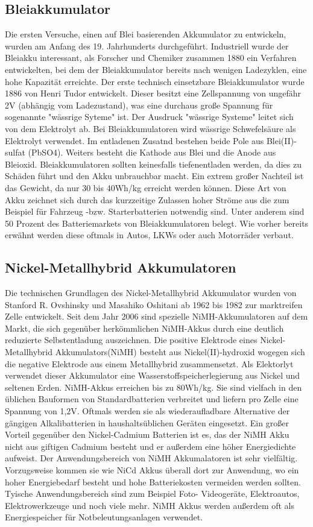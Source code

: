 \subsection{Bleiakkumulator}
Die ersten Versuche, einen auf Blei basierenden Akkumulator zu entwickeln, wurden am Anfang des 19. Jahrhunderts durchgeführt. Industriell wurde der Bleiakku interessant, als Forscher und Chemiker zusammen 1880 ein Verfahren entwickelten, bei dem der Bleiakkumulator bereits nach wenigen Ladezyklen, eine hohe Kapazität erreichte. Der erste technisch einsetzbare Bleiakkumulator wurde 1886 von Henri Tudor entwickelt. Dieser besitzt eine Zellspannung von ungefähr 2V (abhängig vom Ladezustand), was eine durchaus große Spannung für sogenannte "wässrige Syteme"  ist. Der Ausdruck "wässrige Systeme"  leitet sich von dem Elektrolyt ab. Bei Bleiakkumulatoren wird wässrige Schwefelsäure als Elektrolyt verwendet. Im entladenen Zusatnd bestehen beide Pole aus Blei(II)-sulfat (PbSO4). Weiters besteht die Kathode aus Blei und die Anode aus Bleioxid. Bleiakkumulatoren sollten keinesfalls tiefenentladen werden, da dies zu Schäden führt und den Akku unbrauchbar macht. Ein extrem großer Nachteil ist das Gewicht, da nur 30 bis 40Wh/kg erreicht werden können.
Diese Art von Akku zeichnet sich durch das kurzzeitige Zulassen hoher Ströme aus die zum Beispiel für Fahrzeug -bzw. Starterbatterien notwendig sind. Unter anderem sind 50 Prozent des Batteriemarkets von Bleiakkumulatoren belegt. Wie vorher bereits erwähnt werden diese oftmals in Autos, LKWs oder auch Motorräder verbaut.

\subsection{Nickel-Metallhybrid Akkumulatoren}
Die technischen Grundlagen des Nickel-Metallhybrid Akkumulator wurden von Stanford R. Ovshinsky und Masahiko Oshitani ab 1962 bis 1982 zur marktreifen Zelle entwickelt. Seit dem Jahr 2006 sind spezielle NiMH-Akkumulatoren auf dem Markt, die sich gegenüber herkömmlichen NiMH-Akkus durch eine deutlich reduzierte Selbstentladung auszeichnen. Die positive Elektrode eines Nickel-Metallhybrid Akkumulators(NiMH) besteht aus Nickel(II)-hydroxid wogegen sich die negative Elektrode aus einem Metallhybrid zusammensetzt. Als Elektorlyt verwendet dieser Akkumulator eine Wasserstoffspeicherlegierung aus Nickel und seltenen Erden. NiMH-Akkus erreichen bis zu 80Wh/kg. Sie sind vielfach in den üblichen Bauformen von Standardbatterien verbreitet und liefern pro Zelle eine Spannung von 1,2V. Oftmals werden sie als wiederaufladbare Alternative der gängigen Alkalibatterien in haushaltsüblichen Geräten eingesetzt. Ein großer Vorteil gegenüber den Nickel-Cadmium Batterien ist es, das der NiMH Akku nicht aus giftigen Cadmium besteht und er außerdem eine höher Energiedichte aufweist.
Der Anwendungsbereich von NiMH Akkumalatoren ist sehr vielfältig. Vorzugsweise kommen sie wie NiCd Akkus überall dort zur Anwendung, wo ein hoher Energiebedarf besteht und hohe Batteriekosten vermeiden werden sollten. Tyische Anwendungsbereich sind zum Beispiel Foto- Videogeräte, Elektroautos, Elektrowerkzeuge und noch viele mehr. NiMH Akkus werden außerdem oft als Energiespeicher für Notbeleutungsanlagen verwendet.
\newpage
